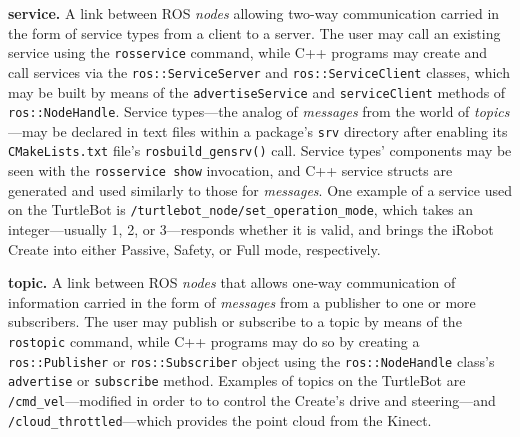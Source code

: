 \documentclass[12pt]{report}
\begin{document}
\begin{itemize}
\begin{sloppypar}
\item{\textbf{service.} A link between ROS \textit{nodes} allowing two-way communication carried in the form of service types from a client to a server.  The user may call an existing service using the \texttt{rosservice} command, while C++ programs may create and call services via the \texttt{ros::ServiceServer} and \texttt{ros::ServiceClient} classes, which may be built by means of the \texttt{advertiseService} and \texttt{serviceClient} methods of \texttt{ros::NodeHandle}.  Service types---the analog of \textit{messages} from the world of \textit{topics}---may be declared in text files within a package's \texttt{srv} directory after enabling its \texttt{CMakeLists.txt} file's \texttt{rosbuild\_gensrv()} call.  Service types' components may be seen with the \texttt{rosservice show} invocation, and C++ service structs are generated and used similarly to those for \textit{messages}.  One example of a service used on the TurtleBot is \texttt{/turtlebot\_node/set\_operation\_mode}, which takes an integer---usually 1, 2, or 3---responds whether it is valid, and brings the iRobot Create into either Passive, Safety, or Full mode, respectively.}
\end{sloppypar}
\item{\textbf{topic.} A link between ROS \textit{nodes} that allows one-way communication of information carried in the form of \textit{messages} from a publisher to one or more subscribers.  The user may publish or subscribe to a topic by means of the \texttt{rostopic} command, while C++ programs may do so by creating a \texttt{ros::Publisher} or \texttt{ros::Subscriber} object using the \texttt{ros::NodeHandle} class's \texttt{advertise} or \texttt{subscribe} method.  Examples of topics on the TurtleBot are \texttt{/cmd\_vel}---modified in order to to control the Create's drive and steering---and \texttt{/cloud\_throttled}---which provides the point cloud from the Kinect.}
\end{itemize}
\end{document}
